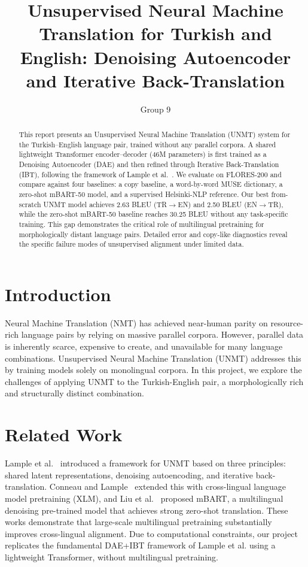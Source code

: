 \documentclass[runningheads]{llncs}
\begin{document}
\title{Unsupervised Neural Machine Translation for Turkish and English: Denoising Autoencoder and Iterative Back-Translation}
\author{Group 9}
\maketitle

\begin{abstract}
This report presents an Unsupervised Neural Machine Translation (UNMT) system for the Turkish--English language pair, trained without any parallel corpora. A shared lightweight Transformer encoder--decoder (46M parameters) is first trained as a Denoising Autoencoder (DAE) and then refined through Iterative Back-Translation (IBT), following the framework of Lample et al.~\cite{lample2018phrase}. We evaluate on FLORES-200 and compare against four baselines: a copy baseline, a word-by-word MUSE dictionary, a zero-shot mBART-50 model, and a supervised Helsinki-NLP reference. Our best from-scratch UNMT model achieves 2.63 BLEU (TR$\rightarrow$EN) and 2.50 BLEU (EN$\rightarrow$TR), while the zero-shot mBART-50 baseline reaches 30.25 BLEU without any task-specific training. This gap demonstrates the critical role of multilingual pretraining for morphologically distant language pairs. Detailed error and copy-like diagnostics reveal the specific failure modes of unsupervised alignment under limited data.
\end{abstract}

\section{Introduction}
Neural Machine Translation (NMT) has achieved near-human parity on resource-rich language pairs by relying on massive parallel corpora. However, parallel data is inherently scarce, expensive to create, and unavailable for many language combinations. Unsupervised Neural Machine Translation (UNMT) addresses this by training models solely on monolingual corpora. In this project, we explore the challenges of applying UNMT to the Turkish-English pair, a morphologically rich and structurally distinct combination.

\section{Related Work}
Lample et al.~\cite{lample2018phrase} introduced a framework for UNMT based on three principles: shared latent representations, denoising autoencoding, and iterative back-translation. Conneau and Lample~\cite{conneau2019cross} extended this with cross-lingual language model pretraining (XLM), and Liu et al.~\cite{liu2020multilingual} proposed mBART, a multilingual denoising pre-trained model that achieves strong zero-shot translation. These works demonstrate that large-scale multilingual pretraining substantially improves cross-lingual alignment. Due to computational constraints, our project replicates the fundamental DAE+IBT framework of Lample et al. using a lightweight Transformer, without multilingual pretraining.
\end{document}
